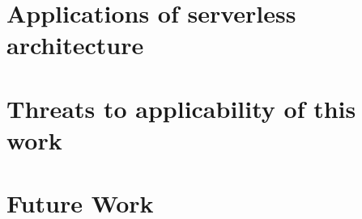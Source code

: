 \section{Applications of serverless architecture}
\section{Threats to applicability of this work}\label{sec:threats}
\section{Future Work}\label{sec:futureWork}


